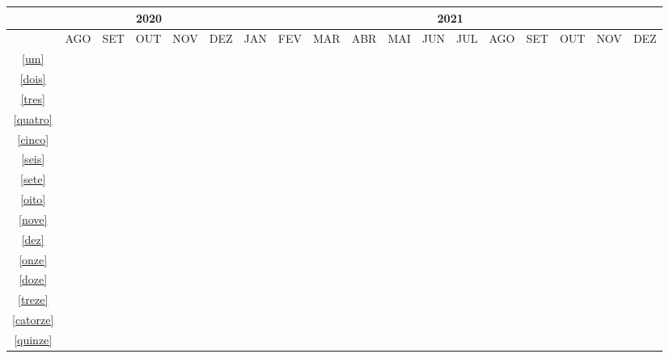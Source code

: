 \begin{landscape}
\begin{table}[!htbp]
    \centering
		\begin{tabular}{|c|c|c|c|c|c|c|c|c|c|c|c|c|c|c|c|c|c|}
		\hline
		&\multicolumn{5}{c|}{2020}&\multicolumn{12}{c|}{2021}\\
		\hline
		&AGO&SET&OUT&NOV&DEZ&JAN&FEV&MAR&ABR&MAI&JUN&JUL&AGO&SET&OUT&NOV&DEZ\\
		\hline
		\ref{um}&\cellcolor{midgray}&\cellcolor{midgray}&&&&&&&&&&&&&&&\\
		\hline
		\ref{dois}&&\cellcolor{midgray}&&&&&&&&&&&&&&&\\
		\hline	
		\ref{tres}&&\cellcolor{midgray}&&&&&&&&&&&&&&&\\
		\hline			
		\ref{quatro}&&\cellcolor{midgray}&\cellcolor{midgray}&&&&&&&&&&&&&&\\
		\hline	
		\ref{cinco}&&&\cellcolor{midgray}&\cellcolor{midgray}&&&&&&&&&&&&&\\
		\hline
		\ref{seis}&&&&\cellcolor{midgray}&\cellcolor{midgray}&&&&&&&&&&&&\\
		\hline	
		\ref{sete}&&&&&\cellcolor{midgray}&\cellcolor{midgray}&&&&&&&&&&&\\
		\hline	
		\ref{oito}&&&&&\cellcolor{midgray}&\cellcolor{midgray}&\cellcolor{midgray}&&&&&&&&&&\\
		\hline	
		\ref{nove}&&&&&&&\cellcolor{midgray}&\cellcolor{midgray}&&&&&&&&&\\
		\hline	
		\ref{dez}&&&&&&&&&\cellcolor{midgray}&&&&&&&&\\
		\hline	
		\ref{onze}&&&&&&&&&\cellcolor{midgray}&\cellcolor{midgray}&&&&&&&\\
		\hline	
		\ref{doze}&&&&&&&&&&\cellcolor{midgray}&\cellcolor{midgray}&\cellcolor{midgray}&&&&&\\
		\hline	
		\ref{treze}&&&&&&&&&&&&\cellcolor{midgray}&&&&&\\
		\hline
		
		\ref{catorze}&&&&&&&&&&&&\cellcolor{midgray}&\cellcolor{midgray}&\cellcolor{midgray}&\cellcolor{midgray}&\cellcolor{midgray}&\cellcolor{midgray}\\
		\hline	
		\ref{quinze}&&&&&&&&&&&&\cellcolor{midgray}&\cellcolor{midgray}&\cellcolor{midgray}&\cellcolor{midgray}&\cellcolor{midgray}&\cellcolor{midgray}\\
		\hline	
		\end{tabular}
\end{table}
\end{landscape}